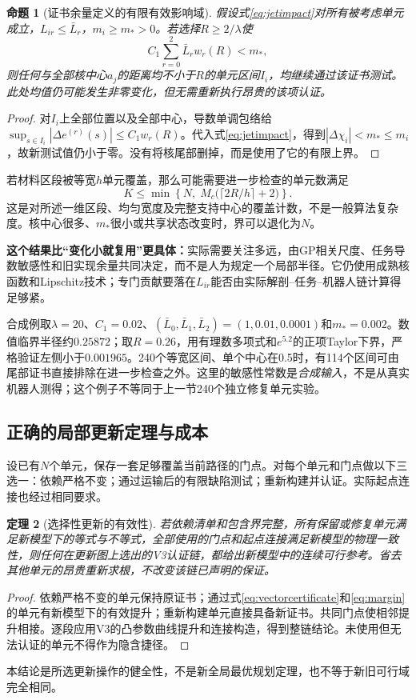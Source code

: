 \documentclass[UTF8,11pt,a4paper,fontset=fandol]{ctexart}
\numberwithin{equation}{section}
\newtheorem{theorem}{定理}[section]
\newtheorem{proposition}[theorem]{命题}
\theoremstyle{definition}
\begin{document}
\begin{proposition}[证书余量定义的有限有效影响域]
假设式\eqref{eq:jetimpact}对所有被考虑单元成立，$L_{ir}\le\bar L_r$，$m_i\ge m_*>0$。若选择$R\ge2/\lambda$使
\begin{equation}
 \boxed{C_1\sum_{r=0}^{2}\bar L_r w_r(R)<m_*,}
 \label{eq:finiteradius}
\end{equation}
则任何与全部核中心$a_j$的距离均不小于$R$的单元区间$I_i$，均继续通过该证书测试。此处均值仍可能发生非零变化，但无需重新执行昂贵的该项认证。
\end{proposition}
\begin{proof}
对$I_i$上全部位置以及全部中心，导数单调包络给
$\sup_{s\in I_i}|\Delta e^{(r)}(s)|\le C_1w_r(R)$。代入式\eqref{eq:jetimpact}，得到$|\Delta\chi_i|<m_*\le m_i$，故新测试值仍小于零。没有将核尾部删掉，而是使用了它的有限上界。
\end{proof}

若材料区段被等宽$h$单元覆盖，那么可能需要进一步检查的单元数满足
\begin{equation}
 \boxed{K\le\min\left\{N,\;M_c\bigl(\lceil2R/h\rceil+2\bigr)\right\}.}
 \label{eq:candidatecount}
\end{equation}
这是对所述一维区段、均匀宽度及完整支持中心的覆盖计数，不是一般算法复杂度。核中心很多、$m_*$很小或共享状态改变时，界可以退化为$N$。

\textbf{这个结果比“变化小就复用”更具体：}实际需要关注多远，由GP相关尺度、任务导数敏感性和旧实现余量共同决定，而不是人为规定一个局部半径。它仍使用成熟核函数和Lipschitz技术；专门贡献要落在$L_{ir}$能否由实际解剖--任务--机器人链计算得足够紧。

合成例取$\lambda=20$、$C_1=0.02$、$(\bar L_0,\bar L_1,\bar L_2)=(1,0.01,0.0001)$和$m_*=0.002$。数值临界半径约$0.25872$；取$R=0.26$，用有理数多项式和$e^{5.2}$的正项Taylor下界，严格验证左侧小于$0.001965$。240个等宽区间、单个中心在0.5时，有114个区间可由尾部证书直接排除在进一步检查之外。这里的敏感性常数是\emph{合成输入}，不是从真实机器人测得；这个例子不等同于上一节240个独立修复单元实验。

\subsection{正确的局部更新定理与成本}
设已有$N$个单元，保存一套足够覆盖当前路径的门点。对每个单元和门点做以下三选一：依赖严格不变；通过运输后的有限缺陷测试；重新构建并认证。实际起点连接也经过相同要求。

\begin{theorem}[选择性更新的有效性]
若依赖清单和包含界完整，所有保留或修复单元满足新模型下的等式与不等式，全部使用的门点和起点连接满足新模型的物理一致性，则任何在更新图上选出的V3认证链，都给出新模型中的连续可行参考。省去其他单元的昂贵重新求根，不改变该链已声明的保证。
\end{theorem}
\begin{proof}
依赖严格不变的单元保持原证书；通过式\eqref{eq:vectorcertificate}和\eqref{eq:margin}的单元有新模型下的有效提升；重新构建单元直接具备新证书。共同门点使相邻提升相接。逐段应用V3的凸参数曲线提升和连接构造，得到整链结论。未使用但无法认证的单元不得作为隐含捷径。
\end{proof}
本结论是所选更新操作的健全性，不是新全局最优规划定理，也不等于新旧可行域完全相同。
\end{document}
